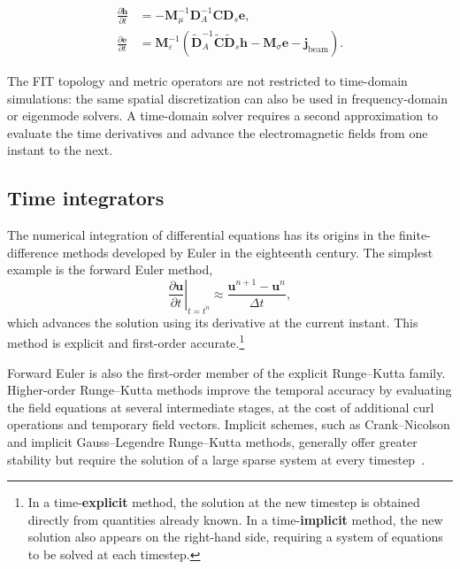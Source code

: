 \begin{equation}
\begin{aligned}
\frac{\partial\mathbf{h}}{\partial t}
&= -\mathbf{M}_{\mu}^{-1}
\mathbf{D}_A^{-1}
\mathbf{C}\mathbf{D}_s\mathbf{e},
\\
\frac{\partial\mathbf{e}}{\partial t}
&=
\mathbf{M}_{\varepsilon}^{-1}
\left(
\widetilde{\mathbf{D}}_A^{-1}
\widetilde{\mathbf{C}}\widetilde{\mathbf{D}}_s\mathbf{h}
-\mathbf{M}_{\sigma}\mathbf{e} -\mathbf{j}_{\mathrm{beam}}
\right).
\end{aligned}
\label{eq:fit_semidiscrete_time_system}
\end{equation}

The FIT topology and metric operators are not restricted to time-domain simulations: the same spatial discretization can also be used in frequency-domain or eigenmode solvers. A time-domain solver requires a second approximation to evaluate the time derivatives and advance the electromagnetic fields from one instant to the next.

\subsection{Time integrators}
\label{sec:time_integrators}

The numerical integration of differential equations has its origins in the finite-difference methods developed by Euler in the eighteenth century. The simplest example is the forward Euler method,
%
\begin{equation}
\left.
\frac{\partial\mathbf{u}}{\partial t}
\right|_{t=t^n}
\approx
\frac{\mathbf{u}^{n+1}-\mathbf{u}^{n}}{\Delta t},
\end{equation}
%
which advances the solution using its derivative at the current instant. This method is explicit and first-order accurate.\footnote{In a time-\textbf{explicit} method, the solution at the new timestep is obtained directly from quantities already known. In a time-\textbf{implicit} method, the new solution also appears on the right-hand side, requiring a system of equations to be solved at each timestep.}

Forward Euler is also the first-order member of the explicit Runge--Kutta family. Higher-order Runge--Kutta methods improve the temporal accuracy by evaluating the field equations at several intermediate stages, at the cost of additional curl operations and temporary field vectors. Implicit schemes, such as Crank--Nicolson and implicit Gauss--Legendre Runge--Kutta methods, generally offer greater stability but require the solution of a large sparse system at every timestep~\cite{DORMAND198019}.

